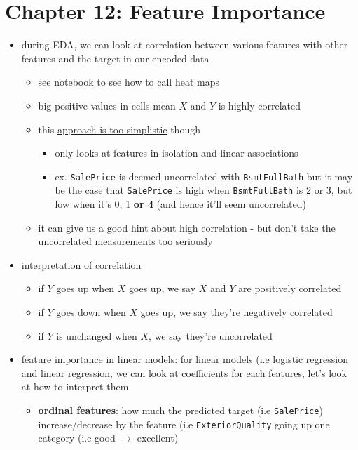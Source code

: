 \documentclass[10.5pt,a4paper, fleqn, dvipsnames]{article}
\makeatletter
\newcommand*{\sectionbookmark}[1][]{%
  \bookmark[%
    level=section,%
    dest=\@currentHref,%
    #1%
  ]%
}
\makeatother
\begin{document}
\section*{Chapter 12: Feature Importance}
\sectionbookmark{Chapter 12: Feature Importance}
\begin{itemize}
    \item during EDA, we can look at correlation between various features with other features and the target in our encoded data 
    \begin{itemize}
        \item see notebook to see how to call heat maps
        \item big positive values in cells mean $X$ and $Y$ is highly correlated
        \item this \ul{approach is too simplistic} though
        \begin{itemize}[leftmargin = 2em]
            \item only looks at features in isolation and linear associations 
            \item ex. \lstinline[language = python]{SalePrice} is deemed uncorrelated with \lstinline{BsmtFullBath} but it may be the case that \lstinline[language = python]{SalePrice} is high when \lstinline[language = python]{BsmtFullBath} is 2 or 3, but low when it's 0, 1 \textbf{or 4} (and hence it'll seem uncorrelated)
        \end{itemize}
        \item it can give us a good hint about high correlation - but don't take the uncorrelated measurements too seriously
    \end{itemize}
    \item interpretation of correlation 
    \begin{itemize}
        \item if $Y$ goes up when $X$ goes up, we say $X$ and $Y$ are positively correlated
        \item if $Y$ goes down when $X$ goes up, we say they're negatively correlated
        \item if $Y$ is unchanged when $X$, we say they're uncorrelated
    \end{itemize}
    \item \ul{feature importance in linear models}: for linear models (i.e logistic regression and linear regression, we can look at \ul{coefficients} for each features, let's look at how to interpret them
    \begin{itemize}
        \item \textbf{ordinal features}: how much the predicted target (i.e \lstinline{SalePrice}) increase/decrease by the feature (i.e \lstinline{ExteriorQuality} going up one category (i.e good $\rightarrow$ excellent)

\end{itemize}
\end{itemize}
\end{document}
